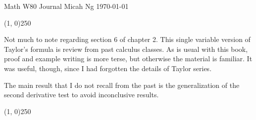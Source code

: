 \documentclass[11pt,letterpaper]{article}
\begin{document}
\noindent
Math W80 Journal \hfill Micah Ng \hfill \today

\begin{center}
\line(1, 0){250}
\end{center}

Not much to note regarding section 6 of chapter 2. This single variable version
of Taylor's formula is review from past calculus classes. As is usual with this
book, proof and example writing is more terse, but otherwise the material is
familiar. It was useful, though, since I had forgotten the details of Taylor
series.

The main result that I do not recall from the past is the generalization of the
second derivative test to avoid inconclusive results.

\begin{center}
\line(1, 0){250}
\end{center}
\end{document}
